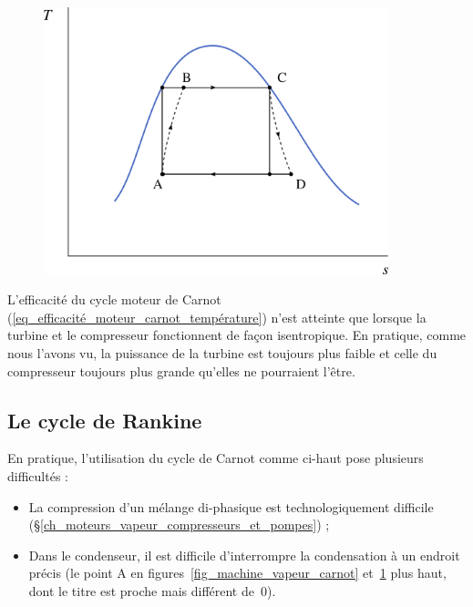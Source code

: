 		\begin{figure}
			\begin{center}
				\includegraphics[width=10cm]{images/ts_lv_carnot.png}
			\end{center}
			\label{fig_ts_machine_vapeur_carnot}
		\end{figure}

		L’efficacité du cycle moteur de Carnot (\ref{eq_efficacité_moteur_carnot_température}) n’est atteinte que lorsque la turbine et le compresseur fonctionnent de façon isentropique. En pratique, comme nous l’avons vu, la puissance de la turbine est toujours plus faible et celle du compresseur toujours plus grande qu’elles ne pourraient l’être.


	\subsection{Le cycle de Rankine}
	\label{ch_cycle_de_rankine}

		En pratique, l’utilisation du cycle de Carnot comme ci-haut pose plusieurs difficultés :

		\begin{itemize}
			\item La compression d’un mélange di-phasique est technologiquement difficile (\S\ref{ch_moteurs_vapeur_compresseurs_et_pompes}) ;
			\item Dans le condenseur, il est difficile d’interrompre la condensation à un endroit précis (le point A en figures~\ref{fig_machine_vapeur_carnot} et~\ref{fig_ts_machine_vapeur_carnot} plus haut, dont le titre est proche mais différent de~0).
		\end{itemize}

